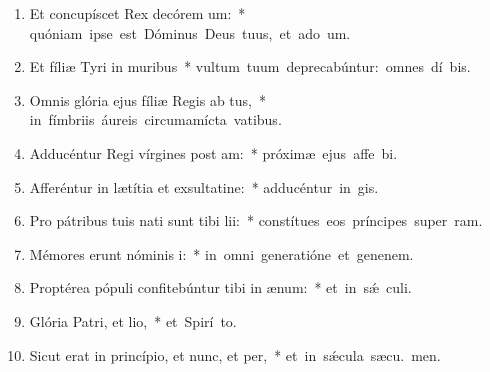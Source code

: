 \begin{flushleft}
\begin{enumerate}[leftmargin=*]
\item Et concupíscet Rex decórem um:~* \mbox{quóniam ipse est Dóminus Deus tuus, et ado um.}

\item Et fíliæ Tyri in muribus~* \mbox{vultum tuum deprecabúntur: omnes dí bis.}

\item Omnis glória ejus fíliæ Regis ab tus,~* \mbox{in fímbriis áureis circumamícta vatibus.}

\item Adducéntur Regi vírgines post am:~* \mbox{próximæ ejus affe bi.}

\item Afferéntur in lætítia et exsultatine:~* \mbox{adducéntur in  gis.}

\item Pro pátribus tuis nati sunt tibi lii:~* \mbox{constítues eos príncipes super  ram.}

\item Mémores erunt nóminis i:~* \mbox{in omni generatióne et genenem.}

\item Proptérea pópuli confitebúntur tibi in ænum:~* \mbox{et in sǽ culi.}

\item Glória Patri, et lio,~* \mbox{et Spirí to.}

\item Sicut erat in princípio, et nunc, et per,~* \mbox{et in sǽcula sæcu. men.}

\end{enumerate}
\end{flushleft}